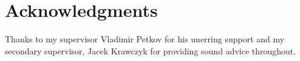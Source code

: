 \chapter*{Acknowledgments}\label{C:ack}

Thanks to my supervisor Vladimir Petkov for his unerring support and
my secondary supervisor, Jacek Krawczyk for providing sound advice
throughout.


